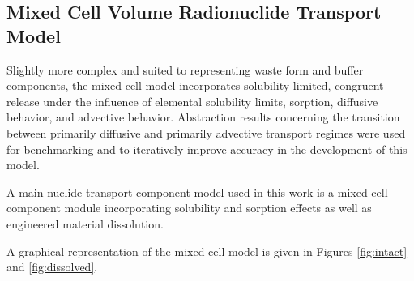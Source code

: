 \subsection{Mixed Cell Volume Radionuclide Transport Model}\label{sec:mixed_cell}
Slightly more complex and suited to representing waste form and buffer 
components, the mixed cell model incorporates solubility limited, congruent 
release under the influence of elemental solubility limits, sorption, diffusive 
behavior, and advective behavior. Abstraction results concerning the 
transition between primarily diffusive and primarily advective transport regimes 
were used for benchmarking and to iteratively improve accuracy in the development 
of this model.

A main nuclide transport component model used in this work is a mixed cell 
component module incorporating solubility and sorption effects as well as  
engineered material dissolution.

A graphical representation of the mixed cell model is given in Figures 
\ref{fig:intact} and \ref{fig:dissolved}.  

